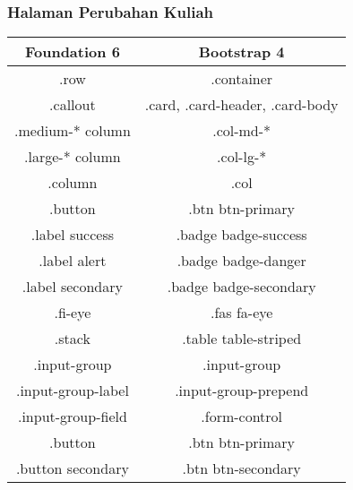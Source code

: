 \subsubsection{Halaman Perubahan Kuliah}
\begin{tabular}{||c|c||} 
	\hline
	\textbf{Foundation 6} & \textbf{Bootstrap 4}  \\ [0.5ex] 
	\hline\hline
	.row &   .container\\ 
	\hline	
	.callout &  .card, .card-header, .card-body \\
	\hline	
	.medium-* column &  .col-md-* \\
	\hline		
	.large-* column &  .col-lg-* \\
	\hline
	.column &  .col \\	
	\hline	
	.button &  .btn btn-primary\\
	\hline	
	.label success &  .badge badge-success \\
	\hline	
	.label alert & .badge badge-danger  \\
	\hline	
	.label secondary & .badge badge-secondary  \\
	\hline	
	.fi-eye &  .fas fa-eye \\	
	\hline		
	.stack & .table table-striped  \\
	\hline	
	.input-group & .input-group  \\ 
	\hline	
	.input-group-label & .input-group-prepend  \\ 
	\hline	
	.input-group-field& .form-control  \\ 
	\hline	
	.button & .btn btn-primary  \\ 
	\hline	
	.button secondary& .btn btn-secondary  \\[1ex] 
	\hline
\end{tabular}

